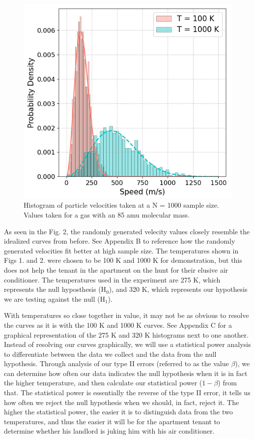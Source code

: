 \documentclass[%
 reprint,
 amsmath,amssymb,
 aps,
]{revtex4-2}
\begin{document}
\begin{figure}[h]
\caption{Histogram of particle velocities taken at a N = 1000 sample size. Values taken for a gas with an 85 amu molecular mass.}
\centering
	\includegraphics[scale=0.51]{code1}
\end{figure}

As seen in the Fig. 2, the randomly generated velecity values closely resemble the idealized curves from before. See Appendix B to reference how the randomly generated velocities fit better at high sample size. The temperatures shown in Figs 1. and 2. were chosen to be 100 K and 1000 K for demonstration, but this does not help the tenant in the apartment on the hunt for their elusive air conditioner. The temperatures used in the experiment are 275 K, which represents the null hyposthesis (H$_0$), and 320 K, which represents our hypothesis we are testing against the null (H$_1$).

With temperatures so close together in value, it may not be as obvious to resolve the curves as it is with the 100 K and 1000 K curves. See Appendix C for a graphical representation of the 275 K and 320 K histograms next to one another. Instead of resolving our curves graphically, we will use a statistical power analysis to differentiate between the data we collect and the data from the null hypothesis. Through analysis of our type II errors (referred to as the value $\beta$), we can determine how often our data indicates the null hypothesis when it is in fact the higher temperature, and then calculate our statistical power ($1-\beta$) from that. The statistical power is essentially the reverse of the type II error, it tells us how often we reject the null hypothesis when we should, in fact, reject it. The higher the statistical power, the easier it is to distinguish data from the two temperatures, and thus the easier it will be for the apartment tenant to determine whether his landlord is juking him with his air conditioner. 
\end{document}
